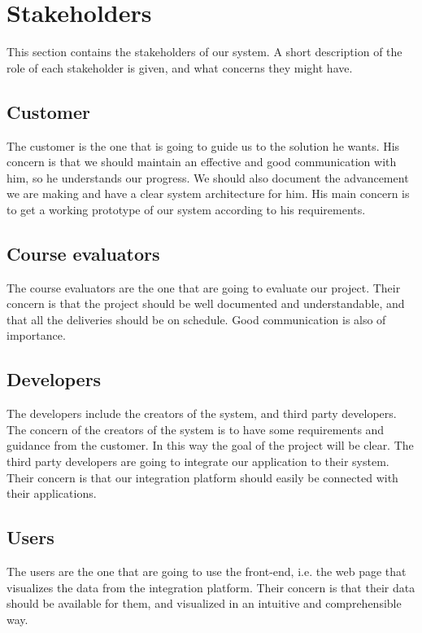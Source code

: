 
\section{Stakeholders}
\label{section:stakeholders}

This section contains the stakeholders of our system.
A short description of the role of each stakeholder is given, and what concerns they might have.

\subsection{Customer}
The customer is the one that is going to guide us to the solution he wants.
His concern is that we should maintain an effective and good communication with him, so he understands our progress.
We should also document the advancement we are making and have a clear system architecture for him.
His main concern is to get a working prototype of our system according to his requirements.

\subsection{Course evaluators}
The course evaluators are the one that are going to evaluate our project. 
Their concern is that the project should be well documented and understandable, and that all the deliveries should be on schedule.
Good communication is also of importance.

\subsection{Developers}
The developers include the creators of the system, and third party developers.
The concern of the creators of the system is to have some requirements and guidance from the customer.
In this way the goal of the project will be clear.
The third party developers are going to integrate our application to their system.
Their concern is that our integration platform should easily be connected with their applications.

\subsection{Users}
The users are the one that are going to use the front-end, i.e. the web page that visualizes the data from the integration platform.
Their concern is that their data should be available for them, and visualized in an intuitive and comprehensible way.

